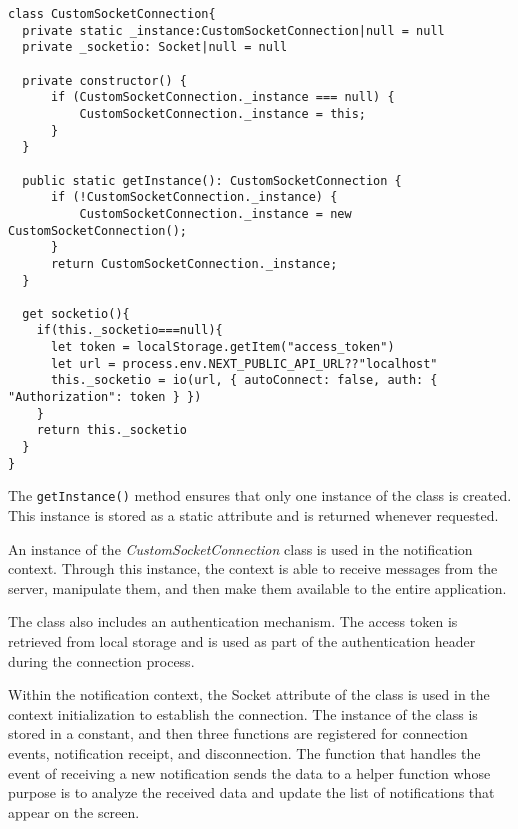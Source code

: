 \begin{verbatim}
class CustomSocketConnection{
  private static _instance:CustomSocketConnection|null = null
  private _socketio: Socket|null = null

  private constructor() {
      if (CustomSocketConnection._instance === null) {
          CustomSocketConnection._instance = this;
      }
  }

  public static getInstance(): CustomSocketConnection {
      if (!CustomSocketConnection._instance) {
          CustomSocketConnection._instance = new CustomSocketConnection();
      }
      return CustomSocketConnection._instance;
  }

  get socketio(){
    if(this._socketio===null){
      let token = localStorage.getItem("access_token")
      let url = process.env.NEXT_PUBLIC_API_URL??"localhost"
      this._socketio = io(url, { autoConnect: false, auth: { "Authorization": token } })
    }
    return this._socketio
  }
}
\end{verbatim}

The \texttt{getInstance()} method ensures that only one instance of the class is created. This instance is stored as a static attribute and is returned whenever requested.

An instance of the \textit{CustomSocketConnection} class is used in the notification context. Through this instance, the context is able to receive messages from the server, manipulate them, and then make them available to the entire application.

The class also includes an authentication mechanism. The access token is retrieved from local storage \cite{mdnLocalStorage} and is used as part of the authentication header during the connection process.

Within the notification context, the Socket attribute of the class is used in the context initialization to establish the connection. The instance of the class is stored in a constant, and then three functions are registered for connection events, notification receipt, and disconnection. The function that handles the event of receiving a new notification sends the data to a helper function whose purpose is to analyze the received data and update the list of notifications that appear on the screen.

